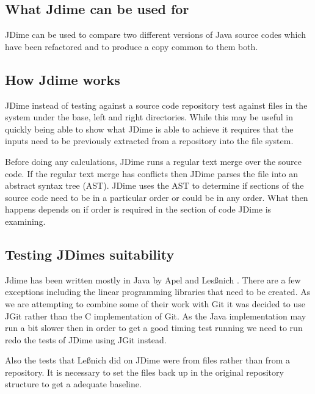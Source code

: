 \subsection{What Jdime can be used for}
JDime can be used to compare two different versions of Java source codes which have been refactored and to produce a copy common to them both. 

\subsection{How Jdime works}
JDime instead of testing against a source code repository test against files in the system under the base, left and right directories.
While this may be useful in quickly being able to show what JDime is able to achieve it requires that the inputs need to be previously extracted from a repository into the file system.

Before doing any calculations, JDime runs a regular text merge over the source code.  
If the regular text merge has conflicts then JDime parses the file into an abstract syntax tree (AST).  JDime uses the AST to determine if sections of the source code need to be in a particular order or could be in any order.
What then happens depends on if order is required in the section of code JDime is examining.

\subsection{Testing JDimes suitability}

Jdime has been written mostly in Java by Apel and Les{\ss}nich \cite{Apel2012} .  There are a few exceptions including the linear programming libraries that need to be created.  As we are attempting to combine some of their work with Git it was decided to use JGit rather than the C implementation of Git. As the Java implementation may run a bit slower then in order to get a good timing test running we need to run redo the tests of JDime using JGit instead. 

Also the tests that Le{\ss}nich did on JDime were from files rather than from a repository. It is necessary to set the files back up in the original repository structure to get a adequate baseline.

